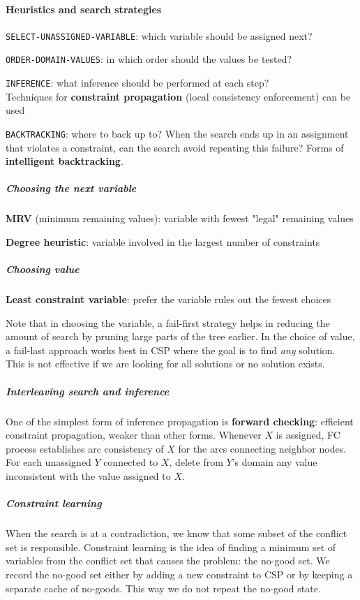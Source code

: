 \documentclass[10pt]{report}
\begin{document}
\paragraph{Heuristics and search strategies}
\begin{list}{}{}
	\item \texttt{SELECT-UNASSIGNED-VARIABLE}: which variable should be assigned next?
	\item \texttt{ORDER-DOMAIN-VALUES}: in which order should the values be tested?
	\item \texttt{INFERENCE}: what inference should be performed at each step?\\
	Techniques for \textbf{constraint propagation} (local consistency enforcement) can be used
	\item \texttt{BACKTRACKING}: where to back up to? When the search ends up in an assignment that violates a constraint, can the search avoid repeating this failure? Forms of \textbf{intelligent backtracking}.
\end{list}
\subparagraph{Choosing the next variable}\begin{list}{}{}
	\item \textbf{MRV} (minimum remaining values): variable with fewest "legal" remaining values
	\item \textbf{Degree heuristic}: variable involved in the largest number of constraints
\end{list}
\subparagraph{Choosing value} \begin{list}{}{}
	\item \textbf{Least constraint variable}: prefer the variable rules out the fewest choices
\end{list}
Note that in choosing the variable, a fail-first strategy helps in reducing the amount of search by pruning large parts of the tree earlier. In the choice of value, a fail-last approach works best in CSP where the goal is to find \textit{any} solution. This is not effective if we are looking for all solutions or no solution exists.
\subparagraph{Interleaving search and inference} One of the simplest form of inference propagation is \textbf{forward checking}: efficient constraint propagation, weaker than other forms. Whenever $X$ is assigned, FC process establishes arc consistency of $X$ for the arcs connecting neighbor nodes. For each unassigned $Y$ connected to $X$, delete from $Y$'s domain any value inconsistent with the value assigned to $X$.
\subparagraph{Constraint learning} When the search is at a contradiction, we know that some subset of the conflict set is responsible. Constraint learning is the idea of finding a minimum set of variables from the conflict set that causes the problem: the no-good set. We record the no-good set either by adding a new constraint to CSP or by keeping a separate cache of no-goods. This way we do not repeat the no-good state.
\end{document}
